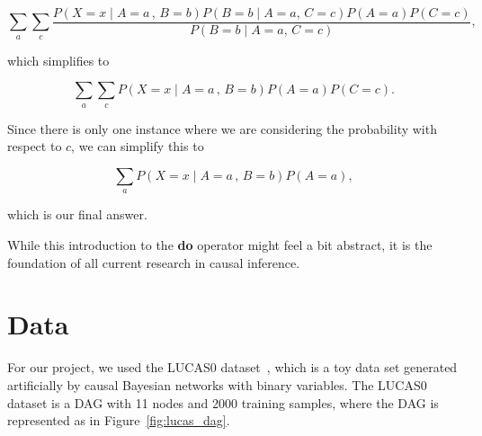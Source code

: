 \documentclass{article}
\begin{document}
\begin{equation*}
    \sum_{a}\sum_{c}\frac{P(X=x\;|\; A=a\,,\, B=b)P(B=b\;|\; A=a,\, C=c)P(A=a)P(C=c)}{P(B=b \;|\; A=a,\, C=c)},
\end{equation*}

which simplifies to

\begin{equation*}
    \sum_{a}\sum_{c}P(X=x\;|\; A=a\,,\, B=b)P(A=a)P(C=c).
\end{equation*}

Since there is only one instance where we are considering the probability with respect to $c$, 
we can simplify this to

\begin{equation*}
    \sum_{a}P(X=x\;|\; A=a\,,\, B=b)P(A=a),
\end{equation*}

which is our final answer.

While this introduction to the \textbf{do} operator might feel a bit abstract, it is the foundation
of all current research in causal inference. 





\section{Data}
\label{data}

For our project, we used the LUCAS0 dataset~\cite{lucas_dataset}, which is a toy data set 
generated artificially by causal Bayesian networks with binary variables. The LUCAS0 dataset
is a DAG with 11 nodes and 2000 training samples, where the DAG is represented as in Figure~\ref{fig:lucas_dag}.
\end{document}
